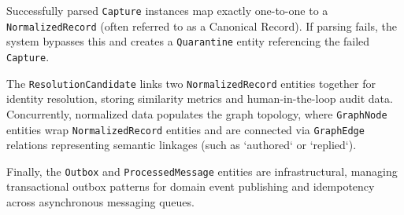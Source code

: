 Successfully parsed \texttt{Capture} instances map exactly one-to-one to a \texttt{NormalizedRecord} (often referred to as a Canonical Record). If parsing fails, the system bypasses this and creates a \texttt{Quarantine} entity referencing the failed \texttt{Capture}. 

The \texttt{ResolutionCandidate} links two \texttt{NormalizedRecord} entities together for identity resolution, storing similarity metrics and human-in-the-loop audit data. Concurrently, normalized data populates the graph topology, where \texttt{GraphNode} entities wrap \texttt{NormalizedRecord} entities and are connected via \texttt{GraphEdge} relations representing semantic linkages (such as `authored` or `replied`). 

Finally, the \texttt{Outbox} and \texttt{ProcessedMessage} entities are infrastructural, managing transactional outbox patterns for domain event publishing and idempotency across asynchronous messaging queues.
